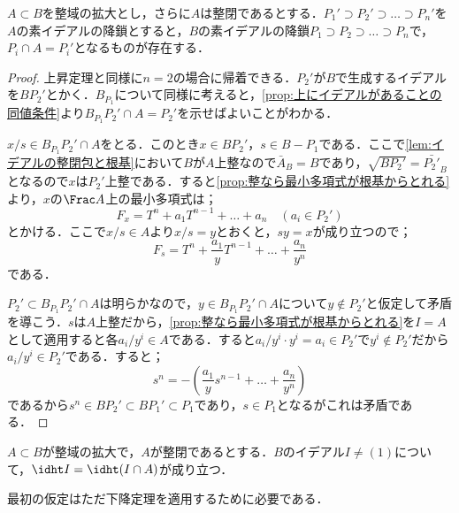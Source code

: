 \begin{thm}[下降定理]\label{thm:going down}
	$A\subset B$を整域の拡大とし，さらに$A$は整閉であるとする．$P_1'\supset P_2'\supset\dots\supset P_n'$を$A$の素イデアルの降鎖とすると，$B$の素イデアルの降鎖$P_1\supset P_2\supset\dots\supset P_n$で，$P_i\cap A=P_i'$となるものが存在する．
\end{thm}

\begin{proof}
	上昇定理と同様に$n=2$の場合に帰着できる．$P_2'$が$B$で生成するイデアルを$BP_2'$とかく．$B_{P_1}$について同様に考えると，\ref{prop:上にイデアルがあることの同値条件}より$B_{P_1}P_2'\cap A=P_2'$を示せばよいことがわかる．
	
	$x/s\in B_{P_1}P_2'\cap A$をとる．このとき$x\in BP_2'，s\in B-P_1$である．ここで\ref{lem:イデアルの整閉包と根基}において$B$が$A$上整なので$\bar{A}_B=B$であり，$\sqrt{BP_2'}=\bar{P_2'}_B$となるので$x$は$P_2'$上整である．すると\ref{prop:整なら最小多項式が根基からとれる}より，$x$の$\Frac A$上の最小多項式は；
	\[F_x=T^n+a_1T^{n-1}+\dots+a_n\quad(a_i\in P_2')\]
	とかける．ここで$x/s\in A$より$x/s=y$とおくと，$sy=x$が成り立つので；
	\[F_s=T^n+\frac{a_1}{y}T^{n-1}+\dots+\frac{a_n}{y^n}\]
	である．
	
	$P_2'\subset B_{P_1}P_2'\cap A$は明らかなので，$y\in B_{P_1}P_2'\cap A$について$y\not\in P_2'$と仮定して矛盾を導こう．$s$は$A$上整だから，\ref{prop:整なら最小多項式が根基からとれる}を$I=A$として適用すると各$a_i/y^i\in A$である．すると$a_i/y^i\cdot y^i=a_i\in P_2'$で$y^i\not\in P_2'$だから$a_i/y^i\in P_2'$である．すると；
	\[s^n=-\left(\frac{a_1}{y}s^{n-1}+\dots+\frac{a_n}{y^n}\right)\]
	であるから$s^n\in BP_2'\subset BP_1'\subset P_1$であり，$s\in P_1$となるがこれは矛盾である．
\end{proof}
\begin{cor}\label{cor:上にあるイデアルの高さ}
	$A\subset B$が整域の拡大で，$A$が整閉であるとする．$B$のイデアル$I\neq(1)$について，$\idht I=\idht (I\cap A)$が成り立つ．	
\end{cor}

最初の仮定はただ下降定理を適用するために必要である．

